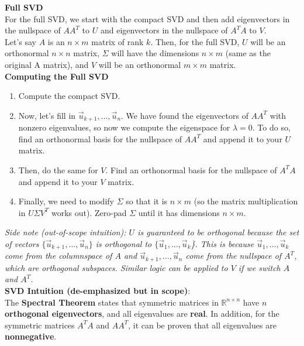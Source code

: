 \textbf{Full SVD} \\
\newline
For the full SVD, we start with the compact SVD and then add eigenvectors in the nullspace of $AA^T$ to $U$ and eigenvectors in the nullspace of $A^TA$ to $V$. \\
\newline
Let's say $A$ is an $n \times m$ matrix of rank $k$. Then, for the full SVD, $U$ will be an orthonormal $n \times n$ matrix, $\Sigma$ will have the dimensions $n \times m$ (same as the original A matrix), and $V$ will be an orthonormal $m \times m$ matrix. \\
\newline
\textbf{Computing the Full SVD}
\begin{enumerate}
    \item Compute the compact SVD.
    \item Now, let's fill in $\vec{u}_{k+1}, \dots, \vec{u}_n$. We have found the eigenvectors of $AA^T$ with nonzero eigenvalues, so now we compute the eigenspace for $\lambda = 0$. To do so, find an orthonormal basis for the nullspace of $AA^T$ and append it to your $U$ matrix.
    \item Then, do the same for $V$. Find an orthonormal basis for the nullspace of $A^T A$ and append it to your $V$ matrix.
    \item Finally, we need to modify $\Sigma$ so that it is $n \times m$ (so the matrix multiplication in $U \Sigma V^T$ works out). Zero-pad $\Sigma$ until it has dimensions $n \times m$.
\end{enumerate}
\textit{Side note (out-of-scope intuition): $U$ is guaranteed to be orthogonal because the set of vectors $\{\vec{u}_{k + 1}, \dots, \vec{u}_n\}$ is orthogonal to $\{\vec{u}_1, \dots, \vec{u}_k$\}. 
This is because $\vec{u}_1, \dots, \vec{u}_k$ come from the columnspace of $A$ and $\vec{u}_{k + 1}, \dots, \vec{u}_n$ come from the nullspace of $A^T$, which are orthogonal subspaces. 
Similar logic can be applied to $V$ if we switch $A$ and $A^T$.} \\
\newline
\textbf{SVD Intuition (de-emphasized but in scope)}: \\
\newline
The \textbf{Spectral Theorem} states that symmetric matrices in $\mathbb{R}^{n\times n}$ have $n$ \textbf{orthogonal eigenvectors}, and all eigenvalues are \textbf{real}. In addition, for the symmetric matrices $A^T A$ and $AA^T$, it can be proven that all eigenvalues are \textbf{nonnegative}. \\
